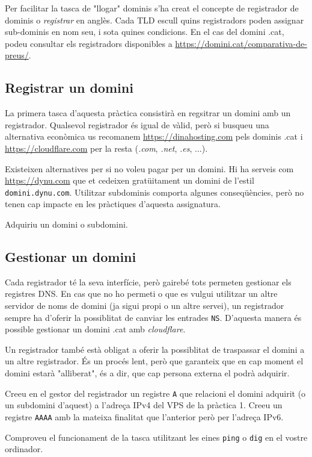 \documentclass{practicaitic}
\begin{document}
Per facilitar la tasca de "llogar" dominis s'ha creat el concepte de
registrador de dominis o \textit{registrar} en anglès. Cada TLD escull quins
registradors poden assignar sub-dominis en nom seu, i sota quines condicions.
En el cas del domini .cat, podeu consultar els registradors disponibles a
\url{https://domini.cat/comparativa-de-preus/}.

\subsection{Registrar un domini}

La primera tasca d'aquesta pràctica consistirà en regsitrar un domini
amb un registrador. Qualsevol registrador és igual de vàlid, però si busqueu
una alternativa econòmica us recomanem \url{https://dinahosting.com} pels
dominis .cat i \url{https://cloudflare.com} per la resta (\textit{.com}, \textit{.net}, \textit{.es}, ...).

Existeixen alternatives per si no voleu pagar per un domini. Hi ha serveis com
\url{https://dynu.com} que et cedeixen gratüitament un domini de l'estil
\texttt{domini.dynu.com}. Utilitzar subdominis comporta algunes conseqüències,
però no tenen cap impacte en les pràctiques d'aquesta assignatura.

\begin{tasca}
  Adquiriu un domini o subdomini.
\end{tasca}

\subsection{Gestionar un domini}

Cada registrador té la seva interfície, però gairebé tots permeten gestionar
els registres DNS. En cas que no ho permeti o que es vulgui utilitzar un altre
servidor de noms de domini (ja sigui propi o un altre servei), un registrador
sempre ha d'oferir la possiblitat de canviar les entrades \texttt{NS}. D'aquesta
manera és possible gestionar un domini .cat amb \textit{cloudflare}.

Un registrador també està obligat a oferir la possiblitat de traspassar el domini
a un altre registrador. És un procés lent, però que garanteix que en cap moment el
domini estarà "alliberat", és a dir, que cap persona externa el podrà adquirir.

\begin{tasca}
  Creeu en el gestor del registrador un registre \texttt{A} que relacioni
  el domini adquirit (o un subdomini d'aquest) a l'adreça IPv4 del VPS de la
  pràctica 1. Creeu un registre \texttt{AAAA} amb la mateixa finalitat que l'anterior
  però per l'adreça IPv6.

  Comproveu el funcionament de la tasca utilitzant les eines \texttt{ping}
  o \texttt{dig} en el vostre ordinador.
\end{tasca}
\end{document}
